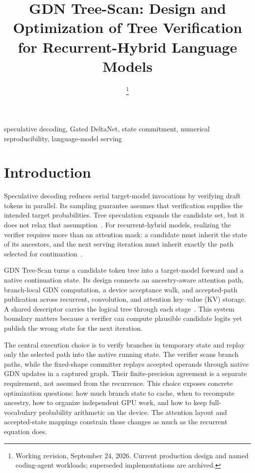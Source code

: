 \documentclass[conference]{IEEEtran}
\newcommand{\sys}{GDN Tree-Scan}
\begin{document}
\title{GDN Tree-Scan: Design and Optimization of Tree Verification for Recurrent-Hybrid Language Models}
\author{
\thanks{Working revision, September 24, 2026. Current production design and named coding-agent workloads; superseded implementations are archived.}}
\maketitle

\begin{IEEEkeywords}
speculative decoding, Gated DeltaNet, state commitment, numerical reproducibility, language-model serving
\end{IEEEkeywords}

\section{Introduction}
Speculative decoding reduces serial target-model invocations by verifying draft tokens in parallel. Its sampling guarantee assumes that verification supplies the intended target probabilities. Tree speculation expands the candidate set, but it does not relax that assumption~\cite{leviathan2023fast,chen2023sampling,miao2023specinfer}. For recurrent-hybrid models, realizing the verifier requires more than an attention mask: a candidate must inherit the state of its ancestors, and the next serving iteration must inherit exactly the path selected for continuation~\cite{yang2024gated,wu2025stree}.

\sys{} turns a candidate token tree into a target-model forward and a native continuation state. Its design connects an ancestry-aware attention path, branch-local GDN computation, a device acceptance walk, and accepted-path publication across recurrent, convolution, and attention key--value (KV) storage. A shared descriptor carries the logical tree through each stage~\cite{lumo2026archive,lumo2026stateless}. This system boundary matters because a verifier can compute plausible candidate logits yet publish the wrong state for the next iteration.

The central execution choice is to verify branches in temporary state and replay only the selected path into the native running state. The verifier scans branch paths, while the fixed-shape committer replays accepted operands through native GDN updates in a captured graph. Their finite-precision agreement is a separate requirement, not assumed from the recurrence. This choice exposes concrete optimization questions: how much branch state to cache, when to recompute ancestry, how to organize independent GPU work, and how to keep full-vocabulary probability arithmetic on the device. The attention layout and accepted-state mappings constrain those changes as much as the recurrent equation does.
\end{document}
